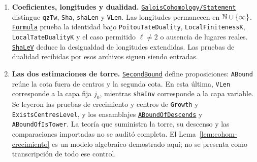 \begin{enumerate}
\item \textbf{Coeficientes, longitudes y dualidad.}
\href{https://github.com/CocoSgt/riemann-hypothesis-lean/blob/7cbf7a0c32fca1badf05931879a37c3f8a2b03b4/src/Formalism/GaloisCohomology/Statement.lean}{\texttt{GaloisCohomology/Statement}}
distingue \texttt{qzTw}, \texttt{Sha}, \texttt{shaLen}
y \texttt{VLen}.
Las longitudes permanecen en $\mathbb{N}\cup\{\infty\}$.
\href{https://github.com/CocoSgt/riemann-hypothesis-lean/blob/7cbf7a0c32fca1badf05931879a37c3f8a2b03b4/src/Development/AutomorphicArithmetic/AutomorphicVarieties/GaloisLibrary/GaloisCohomologyLength/Formula.lean}{\texttt{Formula}}
prueba la identidad bajo
\texttt{PoitouTateDuality}, \texttt{LocalFinitenessK},
\texttt{LocalTateDualityK} y el caso permitido
$\ell\ne2$ o ausencia de lugares reales.
\href{https://github.com/CocoSgt/riemann-hypothesis-lean/blob/7cbf7a0c32fca1badf05931879a37c3f8a2b03b4/src/Development/AutomorphicArithmetic/AutomorphicVarieties/AdditiveValuationNorms/ShaLeV.lean}{\texttt{ShaLeV}}
deduce la desigualdad de longitudes extendidas.
Las pruebas de dualidad recibidas por esos archivos
siguen siendo entradas.

\item \textbf{Las dos estimaciones de torre.}
\href{https://github.com/CocoSgt/riemann-hypothesis-lean/blob/7cbf7a0c32fca1badf05931879a37c3f8a2b03b4/src/Development/AutomorphicArithmetic/AutomorphicVarieties/LayeredIsomorphisms/SecondBound.lean}{\texttt{SecondBound}}
define proposiciones:
\texttt{ABound} reúne la cota fuera de centros y
la segunda cota.
En esta última, \texttt{VLen} corresponde a la capa
fija $j_0$, mientras \texttt{shaInv} corresponde a la
capa variable.
Se leyeron las pruebas de crecimiento y centros de
\texttt{Growth} y \texttt{ExistsCentresLevel},
y los ensamblajes
\href{https://github.com/CocoSgt/riemann-hypothesis-lean/blob/7cbf7a0c32fca1badf05931879a37c3f8a2b03b4/src/Development/AutomorphicArithmetic/AutomorphicVarieties/AdditiveValuationNorms/ABoundOfDescends.lean}{\texttt{ABoundOfDescends}}
y \texttt{ABoundOfIsTower}.
La teoría que suministra la torre, su descenso y
las comparaciones importadas no se auditó completa.
El Lema~\ref{lem:cohom-crecimiento} es un modelo
algebraico demostrado aquí; no se presenta como
transcripción de todo ese control.


\end{enumerate}
